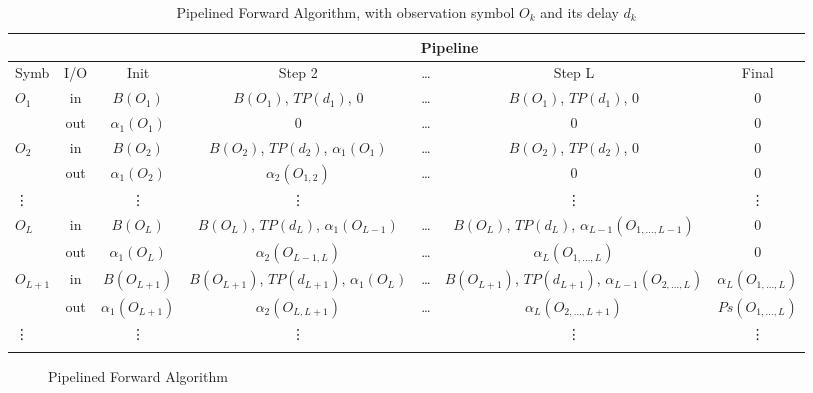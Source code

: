 \documentclass[mscthesis]{usiinfthesis}
\begin{document}
\begin{table}
    \footnotesize
    \begin{center}
    \begin{tabular}{|l|*{6}{c|}}
    \cline{3-7}
    \multicolumn{2}{c|}{} & \multicolumn{5}{c|}{Pipeline}\\
    \hline
    Symb & I/O & Init & Step 2 & \dots & Step L & Final \\
    \hline
    $O_1$ & in
        & $B(O_1)$ & $B(O_1)$, $TP(d_1)$, 0
        & \dots
        & $B(O_1)$, $TP(d_1)$, 0 & 0 \\
        & out
        & $\alpha_1(O_1)$ & 0
        & \dots
        & 0 & 0 \\
    \arrayrulecolor{mysmokegray}\hline
    $O_2$ & in
        & $B(O_2)$ & $B(O_2)$, $TP(d_2)$, $\alpha_1(O_1)$
        & \dots
        & $B(O_2)$, $TP(d_2)$, 0 & 0 \\
        & out
        & $\alpha_1(O_2)$ & $\alpha_2(O_{1,2})$
        & \dots
        & 0 & 0 \\
    \hline
    \vdots & & \vdots & \vdots & & \vdots & \vdots \\
    \hline
    $O_{L}$ & in
        & $B(O_L)$ & $B(O_L)$, $TP(d_L)$, $\alpha_1(O_{L-1})$
        & \dots
        & $B(O_L)$, $TP(d_L)$, $\alpha_{L-1}(O_{1,\dots,{L-1}})$ & 0 \\
        & out
        & $\alpha_1(O_L)$ & $\alpha_2(O_{{L-1},L})$
        & \dots
        & $\alpha_L(O_{1,\dots,L})$ & 0 \\
    \hline
    $O_{L+1}$ & in
        & $B(O_{L+1})$ & $B(O_{L+1})$, $TP(d_{L+1})$, $\alpha_1(O_L)$
        & \dots
        & $B(O_{L+1})$, $TP(d_{L+1})$, $\alpha_{L-1}(O_{2,\dots,L})$ & $\alpha_L(O_{1,\dots,L})$ \\
        & out
        & $\alpha_1(O_{L+1})$ & $\alpha_2(O_{L,{L+1}})$
        & \dots
        & $\alpha_L(O_{2,\dots,{L+1}})$ & $Ps(O_{1,\dots,L})$ \\
    \hline
    \vdots & & \vdots & \vdots & & \vdots & \vdots \\
    \arrayrulecolor{black}\hline
    \end{tabular}
    \end{center}
    \caption{Pipelined Forward Algorithm, with observation symbol $O_k$ and its
        delay $d_k$}
    \label{tab:pipeline}
\end{table}

\begin{figure}
    \centering
    
    \caption{Pipelined Forward Algorithm}
    \label{fig:pipeline}
\end{figure}
\end{document}
